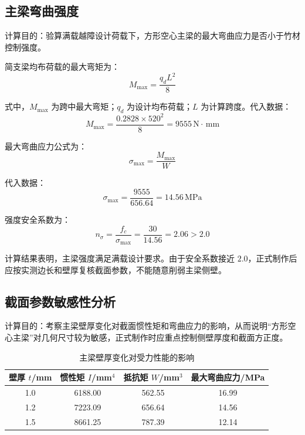 \documentclass[UTF8,a4paper,12pt,fontset=none]{ctexart}
\numberwithin{equation}{section}
\numberwithin{figure}{section}
\numberwithin{table}{section}
\newcommand{\mm}{\,\mathrm{mm}}
\newcommand{\Nunit}{\,\mathrm{N}}
\newcommand{\MPa}{\,\mathrm{MPa}}
\begin{document}
\subsection{主梁弯曲强度}
计算目的：验算满载越障设计荷载下，方形空心主梁的最大弯曲应力是否小于竹材控制强度。

简支梁均布荷载的最大弯矩为：
\begin{equation}
  M_{\max}=\frac{q_dL^2}{8}
\end{equation}

式中，$M_{\max}$ 为跨中最大弯矩；$q_d$ 为设计均布荷载；$L$ 为计算跨度。代入数据：
\begin{equation}
  M_{\max}=\frac{0.2828\times520^2}{8}=9555\Nunit\cdot\mm
\end{equation}

最大弯曲应力公式为：
\begin{equation}
  \sigma_{\max}=\frac{M_{\max}}{W}
\end{equation}

代入数据：
\begin{equation}
  \sigma_{\max}=\frac{9555}{656.64}=14.56\MPa
\end{equation}

强度安全系数为：
\begin{equation}
  n_\sigma=\frac{f_c}{\sigma_{\max}}=\frac{30}{14.56}=2.06>2.0
\end{equation}

计算结果表明，主梁强度满足满载设计要求。由于安全系数接近 $2.0$，正式制作后应按实测边长和壁厚复核截面参数，不能随意削弱主梁侧壁。

\subsection{截面参数敏感性分析}
计算目的：考察主梁壁厚变化对截面惯性矩和弯曲应力的影响，从而说明“方形空心主梁”对几何尺寸较为敏感，正式制作时应重点控制侧壁厚度和截面方正度。

\begin{table}[H]
\centering
\caption{主梁壁厚变化对受力性能的影响}
\label{tab:thickness-sensitivity}
\begin{tabular}{c c c c}
\toprule
壁厚 $t$/mm & 惯性矩 $I$/mm$^4$ & 抵抗矩 $W$/mm$^3$ & 最大弯曲应力/MPa \\
\midrule
1.0 & 6188.00 & 562.55 & 16.99 \\
1.2 & 7223.09 & 656.64 & 14.56 \\
1.5 & 8661.25 & 787.39 & 12.14 \\
\bottomrule
\end{tabular}
\end{table}
\end{document}
